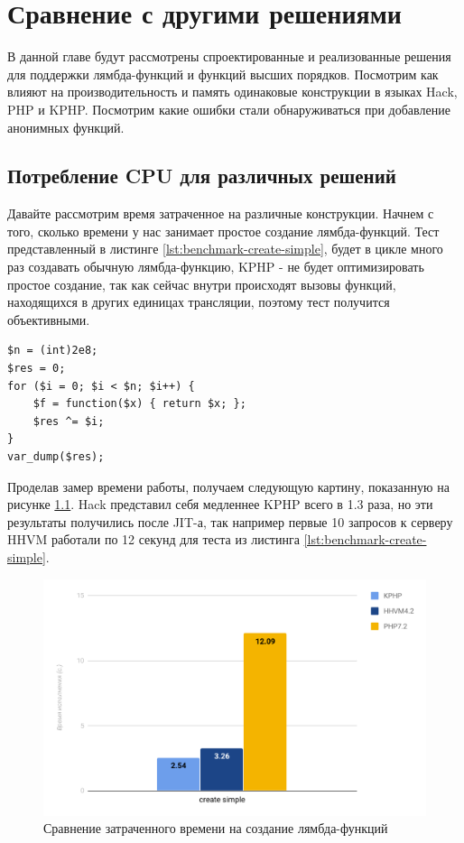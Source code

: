 
\chapter{Сравнение с другими решениями}
В данной главе будут рассмотрены спроектированные и реализованные решения для поддержки лямбда-функций и функций высших порядков.
Посмотрим как влияют на производительность и память одинаковые конструкции в языках Hack, PHP и KPHP.
Посмотрим какие ошибки стали обнаруживаться при добавление анонимных функций.

\section{Потребление CPU для различных решений}
Давайте рассмотрим время затраченное на различные конструкции.
Начнем с того, сколько времени у нас занимает простое создание лямбда-функций.
Тест представленный в листинге \ref{lst:benchmark-create-simple}, будет в цикле много раз создавать обычную лямбда-функцию, KPHP - не будет оптимизировать простое создание, так как сейчас внутри происходят вызовы функций, находящихся в других единицах трансляции, поэтому тест получится объективными.
\begin{lstlisting}[caption={Бенчмарк создания анонимных функций},label={lst:benchmark-create-simple}]
$n = (int)2e8;
$res = 0;
for ($i = 0; $i < $n; $i++) {
    $f = function($x) { return $x; };
    $res ^= $i;
}
var_dump($res);
\end{lstlisting}

Проделав замер времени работы, получаем следующую картину, показанную на рисунке \ref{fig:benchmark-create-simple}.
Hack представил себя медленнее KPHP всего в 1.3 раза, но эти результаты получились после JIT-а, так например первые 10 запросов к серверу HHVM работали по 12 секунд для теста из листинга \ref{lst:benchmark-create-simple}.
\begin{figure}[H]
    \caption{Сравнение затраченного времени на создание лямбда-функций}
    \label{fig:benchmark-create-simple}
    \centering
    \includegraphics[width=\linewidth]{images/benchmark_create_simple}
\end{figure}

